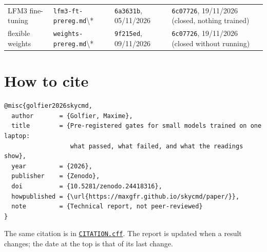 \documentclass[10pt]{article}
\begin{document}
\begin{table}[p]
\begin{tabularx}{\linewidth}{@{}P{2.35cm}P{3.55cm}LL@{}}
LFM3 fine-tuning & \texttt{lfm3-ft-prereg.md}\textbackslash{}* & \texttt{6a3631b}, 05/11/2026 & \texttt{6c07726}, 19/11/2026 (closed, nothing trained) \\
flexible weights & \texttt{weights-prereg.md}\textbackslash{}* & \texttt{9f215ed}, 09/11/2026 & \texttt{6c07726}, 19/11/2026 (closed without running) \\
\bottomrule
\end{tabularx}
\end{table}

\section*{How to cite}

\begin{Verbatim}[fontsize=\small]
@misc{golfier2026skycmd,
  author       = {Golfier, Maxime},
  title        = {Pre-registered gates for small models trained on one laptop:
                  what passed, what failed, and what the readings show},
  year         = {2026},
  publisher    = {Zenodo},
  doi          = {10.5281/zenodo.24418316},
  howpublished = {\url{https://maxgfr.github.io/skycmd/paper/}},
  note         = {Technical report, not peer-reviewed}
}
\end{Verbatim}

\noindent The same citation is in \href{https://github.com/maxgfr/skycmd/blob/main/CITATION.cff}{\texttt{CITATION.cff}}. The report is updated when a result changes; the date at the top is that of its last change.
\end{document}
